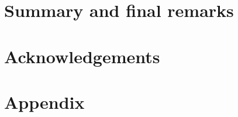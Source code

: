 \documentclass[12pt,a4paper,english]{article}
\begin{document}



\section{Summary and final remarks}



\clearpage
\section*{\hspace{17mm}Acknowledgements}


\clearpage
\section*{\hspace{17mm}Appendix}






\clearpage
\pagebreak



\clearpage
\pagebreak
 
\end{document}
